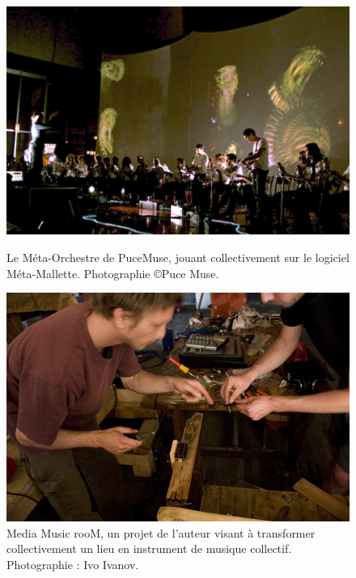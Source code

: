 \begin{figure}[!htbp]
	\captionsetup{format=plain}%
	\centering
	\begin{minipage}[t]{0.48\textwidth}
		\includegraphics[width=\linewidth]{gfx/02_ephemeral/MetaOrchestre.jpg}
		\caption[Méta-Orchestre, jouant collectivement sur le logiciel Méta-Mallette]{Le Méta-Orchestre de PuceMuse, jouant collectivement sur le logiciel Méta-Mallette. Photographie \copyright Puce Muse.}
		\label{fig:ephemeral:meta-orchestre}
	\end{minipage}
	\hspace{.02\linewidth}
	\begin{minipage}[t]{0.48\textwidth}
	  \includegraphics[width=\linewidth]{gfx/02_ephemeral/MediaMusicRoom.jpg}
		\caption[\textit{Media Music rooM}, transformation d'un lieu en instrument de musique]{Media Music rooM, un projet de l'auteur visant à transformer collectivement un lieu en instrument de musique collectif. Photographie : Ivo Ivanov.}
		\label{fig:ephemeral:mediamusicroom}
	\end{minipage}
\end{figure}
